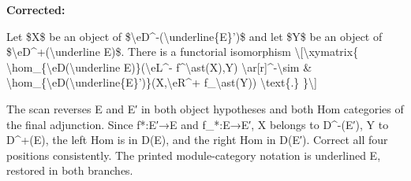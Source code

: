 \begin{description}
\par\noindent\textbf{Corrected:} {\footnotesize\ttfamily\raggedright Let \$X\$ be an object of \$\textbackslash{}\allowbreak{}eD\textasciicircum{}\allowbreak{}-\allowbreak{}(\allowbreak{}\textbackslash{}\allowbreak{}underline\{\allowbreak{}E\}\allowbreak{}')\allowbreak{}\$ and let \$Y\$ be an object of \$\textbackslash{}\allowbreak{}eD\textasciicircum{}\allowbreak{}+\allowbreak{}(\allowbreak{}\textbackslash{}\allowbreak{}underline E)\allowbreak{}\$. There is a functorial isomorphism \textbackslash{}\allowbreak{}[\allowbreak{}\textbackslash{}\allowbreak{}xymatrix\{\allowbreak{}   \textbackslash{}\allowbreak{}hom\_\allowbreak{}\{\allowbreak{}\textbackslash{}\allowbreak{}eD(\allowbreak{}\textbackslash{}\allowbreak{}underline E)\allowbreak{}\}\allowbreak{}(\allowbreak{}\textbackslash{}\allowbreak{}eL\textasciicircum{}\allowbreak{}-\allowbreak{} f\textasciicircum{}\allowbreak{}\textbackslash{}\allowbreak{}ast(\allowbreak{}X)\allowbreak{},\allowbreak{}Y)\allowbreak{} \textbackslash{}\allowbreak{}ar[\allowbreak{}r]\allowbreak{}\textasciicircum{}\allowbreak{}-\allowbreak{}\textbackslash{}\allowbreak{}sim     \& \textbackslash{}\allowbreak{}hom\_\allowbreak{}\{\allowbreak{}\textbackslash{}\allowbreak{}eD(\allowbreak{}\textbackslash{}\allowbreak{}underline\{\allowbreak{}E\}\allowbreak{}')\allowbreak{}\}\allowbreak{}(\allowbreak{}X,\allowbreak{}\textbackslash{}\allowbreak{}eR\textasciicircum{}\allowbreak{}+\allowbreak{} f\_\allowbreak{}\textbackslash{}\allowbreak{}ast(\allowbreak{}Y)\allowbreak{})\allowbreak{} \textbackslash{}\allowbreak{}text\{\allowbreak{}.\}\allowbreak{} \}\allowbreak{}\textbackslash{}\allowbreak{}]\allowbreak{}}
\par\noindent The scan reverses E and E′ in both object hypotheses and both Hom categories of the final adjunction. Since f*:E′→E and f\_*:E→E′, X belongs to D\textasciicircum{}-(E′), Y to D\textasciicircum{}+(E), the left Hom is in D(E), and the right Hom in D(E′). Correct all four positions consistently. The printed module-category notation is underlined E, restored in both branches.
\smallskip
\end{description}
\endgroup
\fi
